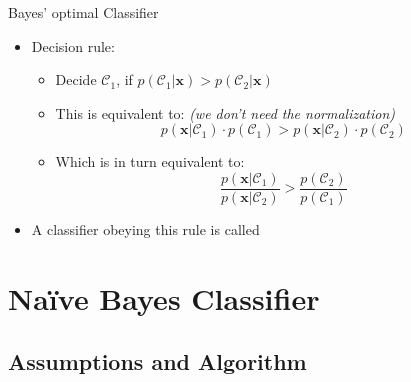 \begin{frame}{Bayes' optimal Classifier}{}\important
	\begin{itemize}
		\item Decision rule:
		\begin{itemize}
			\item Decide $\mathcal{C}_1$, if $p(\mathcal{C}_1 \vert \bm{x}) > p(\mathcal{C}_2 \vert \bm{x})$
			\item This is equivalent to: \textit{(we don't need the normalization)}
			\begin{equation}
				p(\bm{x} \vert \mathcal{C}_1) \cdot p(\mathcal{C}_1) >
					p(\bm{x} \vert \mathcal{C}_2) \cdot p(\mathcal{C}_2)
			\end{equation} 
			\item Which is in turn equivalent to:
			\begin{equation}
				\frac{p(\bm{x} \vert \mathcal{C}_1)}{p(\bm{x} \vert \mathcal{C}_2)} >
					\frac{p(\mathcal{C}_2)}{p(\mathcal{C}_1)}
			\end{equation}
		\end{itemize}
		\item A classifier obeying this rule is called 
	\end{itemize}
\end{frame}


\section{Na\"{i}ve Bayes Classifier}

\subsection{Assumptions and Algorithm}

